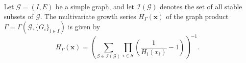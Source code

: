 \documentclass[10pt,a4paper]{amsart}
\begin{document}
\begin{thm}\label{mainthm}
    Let $\mathcal{G}=(I,E)$ be a simple graph, and let $\mathcal{I}(\mathcal{G})$ denotes the set of all stable subsets of $\mathcal{G}$. The multivariate growth series $H_{\Gamma}(\mathbf{x})$ of the graph product $\Gamma =  \Gamma(\mathcal G, \{G_i\}_{i\in I}) $ is given by
\begin{equation}\label{equationthm}
H_{\Gamma}(\mathbf{x}) = \left( \sum_{S \in \mathcal{I}(\mathcal{G})} \prod_{i \in S} \left( \frac{1}{H_i(x_i)} - 1 \right) \right)^{-1}.
\end{equation}
\end{thm} 
\end{document}
